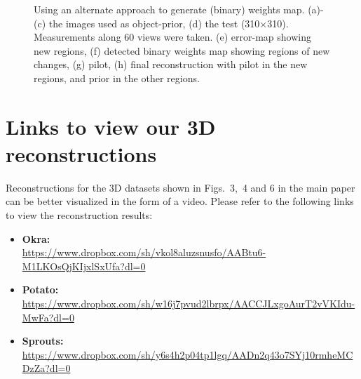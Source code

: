 \documentclass{article}
\begin{document}
\begin{figure}[!h]
\begin{subfigure}[b]{0.31\linewidth}
        \caption{}
     \end{subfigure}

     \caption[Selecting $k$]{Using an alternate approach to generate (binary) weights map. (a)-(c) the images used as object-prior, (d) the test (310$\times$310). Measurements along $60$ views were taken. (e) error-map showing new regions, (f) detected binary weights map showing regions of new changes, (g) pilot, (h) final reconstruction with pilot in the new regions, and prior in the other regions. } %
\label{fig:okra_svm}
\end{figure}
\clearpage


\newpage
\section{Links to view our 3D reconstructions}
Reconstructions for the 3D datasets shown in Figs.~3,~4 and 6 in the main paper can be better visualized in the form of a video. Please refer to the following links to view the reconstruction results:

\begin{itemize}
\item \textbf{Okra:} \\

  \url{https://www.dropbox.com/sh/vkol8aluzsnusfo/AABtu6-M1LKOsQjKIjxlSxUfa?dl=0}\\
\item \textbf{Potato:} \\

  \url{https://www.dropbox.com/sh/w16j7pvud2lbrpx/AACCJLxgoAurT2vVKIdu-MwFa?dl=0}\\
\item \textbf{Sprouts:}\\

  \url{https://www.dropbox.com/sh/y6s4h2p04tp1lgq/AADn2q43o7SYj10rmheMCDzZa?dl=0}\\
\end{itemize}



\clearpage
\newpage
\end{document}
